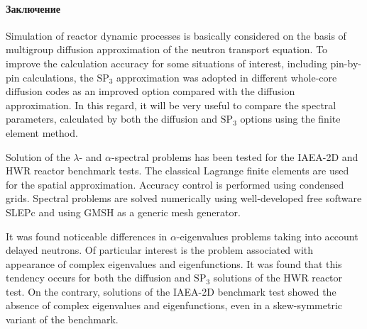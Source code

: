 \documentclass{crm-article}
\begin{document}
\paragraph{Заключение}

Simulation of reactor dynamic processes is basically considered on the basis of multigroup diffusion approximation of the neutron transport equation. 
To improve the calculation accuracy for some situations of interest, including pin-by-pin calculations, the $\mathrm{SP_3}$ approximation was adopted in different whole-core diffusion codes as an improved option compared with the diffusion approximation. 
In this regard, it will be very useful to compare the spectral parameters, calculated by both the diffusion and $\mathrm{SP_3}$ options using the finite element method. 

Solution of the $\lambda$- and $\alpha$-spectral problems has been tested for the IAEA-2D and HWR reactor benchmark tests. 
The classical Lagrange finite elements are used for the spatial approximation. 
Accuracy control is performed using condensed grids. 
Spectral problems are solved numerically using well-developed free software SLEPc and using GMSH as a generic mesh generator.

It was found noticeable differences in $\alpha$-eigenvalues problems taking into account delayed neutrons. 
Of particular interest is the problem associated with appearance of complex eigenvalues and eigenfunctions. 
It was found that this tendency occurs for both the diffusion and $\mathrm{SP_3}$ solutions of the HWR reactor test. 
On the contrary, solutions of the IAEA-2D benchmark test showed the absence of complex eigenvalues and eigenfunctions, even in a skew-symmetric variant of the benchmark.
\end{document}
